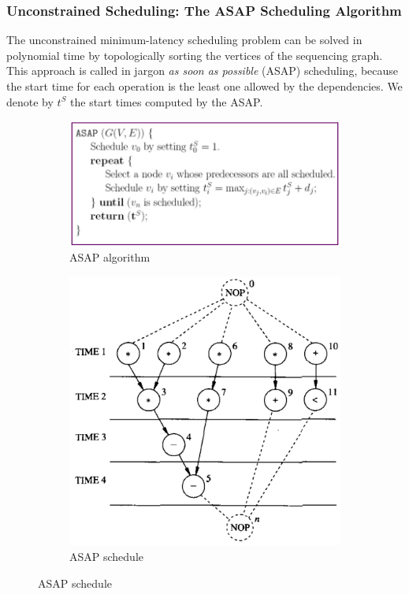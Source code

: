 \subsubsection{Unconstrained Scheduling: The ASAP Scheduling Algorithm}
The unconstrained minimum-latency scheduling problem can be solved in polynomial time by topologically sorting the vertices of the sequencing graph. This approach is called in jargon  \textit{as soon as possible}  (ASAP) scheduling, because the start time for each operation is the least one allowed by the dependencies. We denote by  $ t^{S} $  the start times computed by the ASAP.
\begin{figure}[H]
    \centering
    \begin{subfigure}[b]{0.5\textwidth}
        \includegraphics[width=\textwidth]{./Cap4/Images/Image05.png}
        \caption{ASAP algorithm}
   		\label{fig:ASAPAlg}
    \end{subfigure}
    \quad\quad\quad
    \begin{subfigure}[b]{0.4\textwidth}
        \includegraphics[width=\textwidth]{./Cap4/Images/Image02.png}
        \caption{ASAP schedule}
   		\label{fig:ASAPSch}
    \end{subfigure}
\end{figure}

